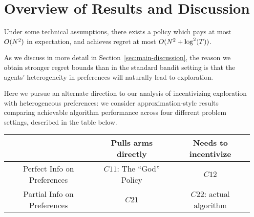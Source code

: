 \section{Overview of Results and Discussion}



\begin{theorem} \label{thm:main-overview}
Under some technical assumptions, 
there exists a policy which pays at most $O(N^2)$ in expectation,
and achieves regret at most $O(N^2 + \log^2(T))$.
\end{theorem}


As we discuss in more detail in Section~\ref{sec:main-discussion},
the reason we obtain stronger regret bounds than in the standard bandit
setting is that the agents' heterogeneity in preferences will
naturally lead to exploration.

Here we pursue an alternate direction to our analysis of incentivizing exploration with heterogeneous preferences: we consider approximation-style results comparing achievable algorithm performance across four different problem settings, described in the table below.

\begin{center}
\begin{tabular}{ c|c|c| } 
 \hline
     & Pulls arms directly & Needs to incentivize \\ 
\hline
 Perfect Info on Preferences & $C11$: The ``God'' Policy & $C12$ \\ 
 Partial Info on Preferences & $C21$ & $C22$: actual algorithm \\ 
 \hline
\end{tabular}
\end{center}

